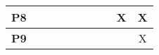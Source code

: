 \begin{table}[b]
{\begin{tabular}{@{}cccccccccc@{}}
\multicolumn{1}{|c|}{\textbf{P8}} & \multicolumn{1}{c|}{}  & \multicolumn{1}{c|}{}  & \multicolumn{1}{c|}{}  & \multicolumn{1}{c|}{}  & \multicolumn{1}{c|}{}  & \multicolumn{1}{c|}{}  & \multicolumn{1}{c|}{}  & \multicolumn{1}{c|}{X} & \multicolumn{1}{c|}{X} \\ \midrule
\multicolumn{1}{|c|}{\textbf{P9}} & \multicolumn{1}{c|}{}  & \multicolumn{1}{c|}{}  & \multicolumn{1}{c|}{}  & \multicolumn{1}{c|}{}  & \multicolumn{1}{c|}{}  & \multicolumn{1}{c|}{}  & \multicolumn{1}{c|}{}  & \multicolumn{1}{c|}{}  & \multicolumn{1}{c|}{X} \\ \bottomrule
\end{tabular}
}
\end{table}
% 
